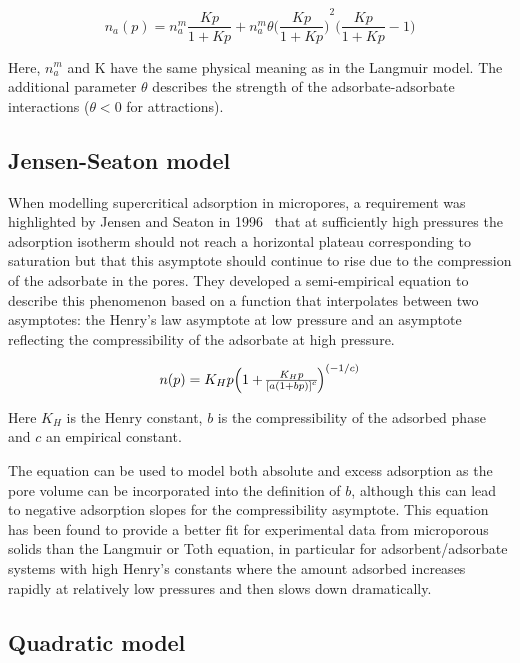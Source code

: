 \begin{equation}\label{pyg:eqn:temkin}
	n_a(p) = n_a^m \frac{Kp}{1+Kp} + n_a^m \theta
	{\Big(\frac{Kp}{1+Kp}\Big)}^2 \Big(\frac{Kp}{1+Kp} -1\Big)
\end{equation}

Here, \(n_a^m\) and K have the same physical meaning as in the
Langmuir model.
The additional parameter \(\theta\) describes the strength of the
adsorbate-adsorbate
interactions (\(\theta < 0\) for attractions).

\subsection{Jensen-Seaton model}\label{pyg:models:jseaton}

When modelling supercritical adsorption in micropores, a requirement was
highlighted by
Jensen and Seaton in 1996~\cite{jensenIsothermEquationAdsorption1996}
that at sufficiently high pressures the adsorption
isotherm should not reach a horizontal plateau corresponding to
saturation but that this asymptote should continue to rise due to 
the compression of the adsorbate in the pores. They developed a 
semi-empirical equation to describe this phenomenon based on a function
that interpolates between two asymptotes: the Henry’s law asymptote at
low pressure and an asymptote reflecting the compressibility of
the adsorbate at high pressure.

\begin{equation}\label{pyg:eqn:jseaton}
	n(p) = K_H p \Big{(1 + \frac{K_H p}{{[a {(1 + b
									p)}]}^c}\Big)}^{(-1/c)}
\end{equation}

Here \(K_H\) is the Henry constant, \(b\) is the compressibility of
the adsorbed phase and \(c\) an empirical constant.

The equation can be used to model both absolute and excess adsorption
as the pore volume can be incorporated into the definition of \(b\), 
although this can lead to negative adsorption slopes for the 
compressibility asymptote. This equation has been found to provide a 
better fit for experimental data from microporous solids than the 
Langmuir or Toth equation, in particular for
adsorbent/adsorbate systems with high Henry’s constants where the
amount adsorbed increases rapidly at relatively low pressures and
then slows down dramatically.

\subsection{Quadratic model}\label{pyg:models:quadratic}


